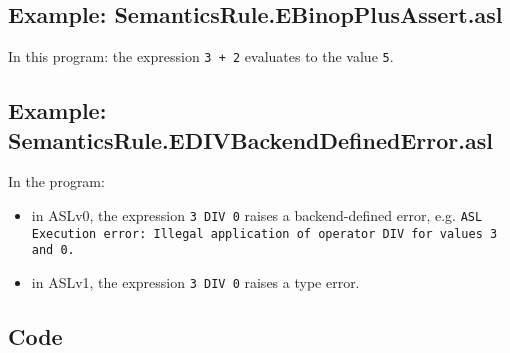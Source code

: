\documentclass{book}
\begin{document}
  \subsection{Example: SemanticsRule.EBinopPlusAssert.asl}
    In this program:
    the expression \texttt{3 + 2} evaluates to the value \texttt{5}.

  \subsection{Example: SemanticsRule.EDIVBackendDefinedError.asl}
    In the program:
    \begin{itemize}
    \item in ASLv0, the expression \texttt{3 DIV 0} raises a backend-defined
      error, e.g.
      \texttt{ASL Execution error: Illegal application of operator DIV for values 3 and 0.}
    \item in ASLv1, the expression \texttt{3 DIV 0} raises a type error.
    \end{itemize}

  \subsection{Code}
\end{document}
